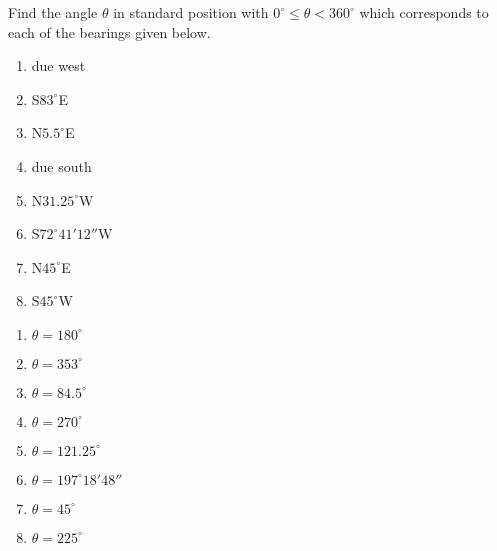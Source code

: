 { Find the angle $\theta$ in standard position with $0^{\circ} \leq \theta < 360^{\circ}$ which corresponds to each of the bearings given below.\begin{enumerate} \item due west \item S$83^{\circ}$E \item N$5.5^{\circ}$E \item due south \item N$31.25^{\circ}$W \item S$72^{\circ}41'12''$W \item N$45^{\circ}$E \item S$45^{\circ}$W \end{enumerate}}
{\begin{enumerate}\item $\theta = 180^{\circ}$ \item $\theta = 353^{\circ}$ \item $\theta = 84.5^{\circ}$ \item $\theta = 270^{\circ}$ \item $\theta = 121.25^{\circ}$ \item $\theta = 197^{\circ} 18' 48''$ \item $\theta = 45^{\circ}$ \item $\theta = 225^{\circ}$ \end{enumerate}}
